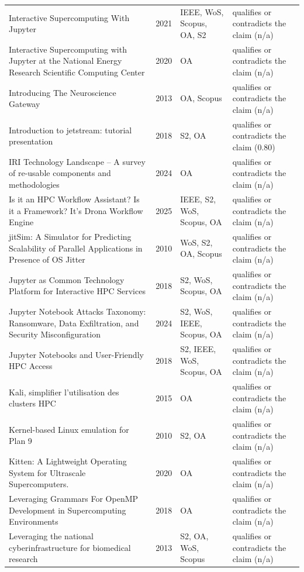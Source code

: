 \begin{longtable}{@{}%
  >{\raggedright\arraybackslash}p{}c%
  >{\raggedright\arraybackslash}p{}%
  >{\raggedright\arraybackslash}p{}@{}}
Interactive Supercomputing With Jupyter & 2021 & IEEE, WoS, Scopus, OA, S2 & qualifies or contradicts the claim (n/a) \\
Interactive Supercomputing with Jupyter at the National Energy Research Scientific Computing Center & 2020 & OA & qualifies or contradicts the claim (n/a) \\
Introducing The Neuroscience Gateway & 2013 & OA, Scopus & qualifies or contradicts the claim (n/a) \\
Introduction to jetstream: tutorial presentation & 2018 & S2, OA & qualifies or contradicts the claim (0.80) \\
IRI Technology Landscape -- A survey of re-usable components and methodologies & 2024 & OA & qualifies or contradicts the claim (n/a) \\
Is it an HPC Workflow Assistant? Is it a Framework? It's Drona Workflow Engine & 2025 & IEEE, S2, WoS, Scopus, OA & qualifies or contradicts the claim (n/a) \\
jitSim: A Simulator for Predicting Scalability of Parallel Applications in Presence of OS Jitter & 2010 & WoS, S2, OA, Scopus & qualifies or contradicts the claim (n/a) \\
Jupyter as Common Technology Platform for Interactive HPC Services & 2018 & S2, WoS, Scopus, OA & qualifies or contradicts the claim (n/a) \\
Jupyter Notebook Attacks Taxonomy: Ransomware, Data Exfiltration, and Security Misconfiguration & 2024 & S2, WoS, IEEE, Scopus, OA & qualifies or contradicts the claim (n/a) \\
Jupyter Notebooks and User-Friendly HPC Access & 2018 & S2, IEEE, WoS, Scopus, OA & qualifies or contradicts the claim (n/a) \\
Kali, simplifier l'utilisation des clusters HPC & 2015 & OA & qualifies or contradicts the claim (n/a) \\
Kernel-based Linux emulation for Plan 9 & 2010 & S2, OA & qualifies or contradicts the claim (n/a) \\
Kitten: A Lightweight Operating System for Ultrascale Supercomputers. & 2020 & OA & qualifies or contradicts the claim (n/a) \\
Leveraging Grammars For OpenMP Development in Supercomputing Environments & 2018 & OA & qualifies or contradicts the claim (n/a) \\
Leveraging the national cyberinfrastructure for biomedical research & 2013 & S2, OA, WoS, Scopus & qualifies or contradicts the claim (n/a) \\

\end{longtable}
